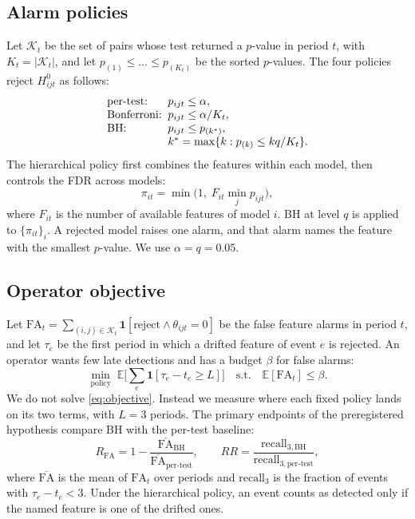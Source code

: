 \documentclass[journal]{IEEEtran}
\begin{document}
\subsection{Alarm policies}

Let $\mathcal{K}_t$ be the set of pairs whose test returned a $p$-value in period $t$, with $K_t=|\mathcal{K}_t|$, and let $p_{(1)}\le\dots\le p_{(K_t)}$ be the sorted $p$-values. The four policies reject $H^0_{ijt}$ as follows:
\begin{equation}
\begin{array}{@{}l@{\;\;}l@{}}
\text{per-test:} & p_{ijt}\le\alpha,\\
\text{Bonferroni:} & p_{ijt}\le\alpha/K_t,\\
\text{BH:} & p_{ijt}\le p_{(k^\ast)},\\
 & k^\ast=\max\{k: p_{(k)}\le kq/K_t\}.
\end{array}
\label{eq:policies}
\end{equation}
The hierarchical policy first combines the features within each model, then controls the FDR across models:
\begin{equation}
\pi_{it}=\min\!\Big(1,\;F_{it}\min_{j}p_{ijt}\Big),
\label{eq:hier}
\end{equation}
where $F_{it}$ is the number of available features of model $i$. BH at level $q$ is applied to $\{\pi_{it}\}_i$. A rejected model raises one alarm, and that alarm names the feature with the smallest $p$-value. We use $\alpha=q=0.05$.

\subsection{Operator objective}

Let $\mathrm{FA}_t=\sum_{(i,j)\in\mathcal{K}_t}\mathbf{1}[\text{reject}\wedge\theta_{ijt}=0]$ be the false feature alarms in period $t$, and let $\tau_e$ be the first period in which a drifted feature of event $e$ is rejected. An operator wants few late detections and has a budget $\beta$ for false alarms:
\begin{equation}
\min_{\text{policy}}\;\mathbb{E}\Big[\sum_e\mathbf{1}\left[\tau_e-t_e\ge L\right]\Big]
\quad\text{s.t.}\quad \mathbb{E}[\mathrm{FA}_t]\le\beta .
\label{eq:objective}
\end{equation}
We do not solve \eqref{eq:objective}. Instead we measure where each fixed policy lands on its two terms, with $L=3$ periods. The primary endpoints of the preregistered hypothesis compare BH with the per-test baseline:
\begin{equation}
R_{\mathrm{FA}}=1-\frac{\overline{\mathrm{FA}}_{\mathrm{BH}}}{\overline{\mathrm{FA}}_{\text{per-test}}},\qquad
RR=\frac{\mathrm{recall}_{3,\mathrm{BH}}}{\mathrm{recall}_{3,\text{per-test}}},
\label{eq:endpoints}
\end{equation}
where $\overline{\mathrm{FA}}$ is the mean of $\mathrm{FA}_t$ over periods and $\mathrm{recall}_3$ is the fraction of events with $\tau_e-t_e<3$. Under the hierarchical policy, an event counts as detected only if the named feature is one of the drifted ones.
\end{document}
